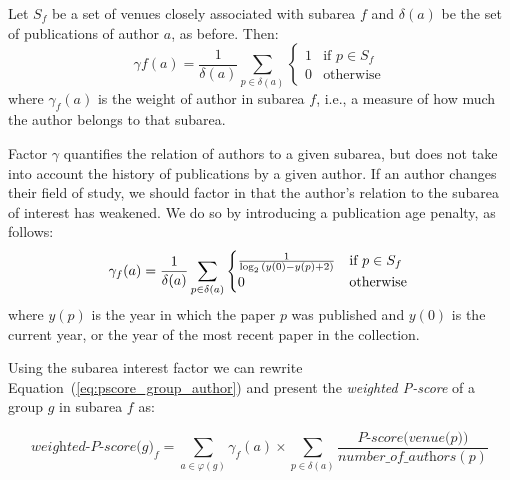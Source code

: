 \documentclass[msc]{ppgccufmg}
\begin{document}
Let $S_{f}$ be a set of venues closely associated with subarea $f$ and $\delta(a)$ be the set of publications of author $a$, as before. Then:
\begin{equation}\label{eq:author_factor}
    \gamma{f}(a) = \frac{1}{\delta(a)} \sum_{p \in \delta(a)}
    \begin{cases}
         1 & \mbox{if $p \in S_{f}$}\\ 
         0 & \mbox{otherwise} 
    \end{cases}
\end{equation}
where $\gamma_{f}(a)$ is the weight of author in subarea $f$, i.e., a measure of how much the author belongs to that subarea.

Factor $\gamma$ quantifies the relation of authors to a given subarea, but does not take into account the history of publications by a given author. 
If an author changes their field of study, we should factor in that the author's relation to the subarea of interest has weakened. We do so by introducing a publication age penalty, as follows:
\begin{equation}\label{eq:author_factor_year}
    \gamma_{f}(a) = \frac{1}{\delta(a)} \sum_{p \in \delta(a)}
    \begin{cases}
      \frac{1}{\log_2 {(y(0) - y(p) + 2)}} & \mbox{if $p \in S_{f}$} \\
      0 & \mbox{otherwise} 
    \end{cases} \\ %
\end{equation}
where $y(p)$ is the year in which the paper $p$ was published and $y(0)$ is the current year, or the year of the most recent paper in the collection. 

Using the subarea interest factor we can rewrite Equation~(\ref{eq:pscore_group_author}) and present the \textit{weighted P-score} of a group $\textit{g}$ in subarea $\textit{f}$ as:

\begin{equation}\label{eq:group_pscore_author_factor}
	\textit{weighted-P-score($g$)}_f = \sum_{a \in \varphi(g)} \gamma_f(a) \times \sum_{p \in \delta(a)} \frac{\textit{P-score(venue(p))}}{\textit{number\_of\_authors}(p)}
\end{equation}
~
\end{document}
